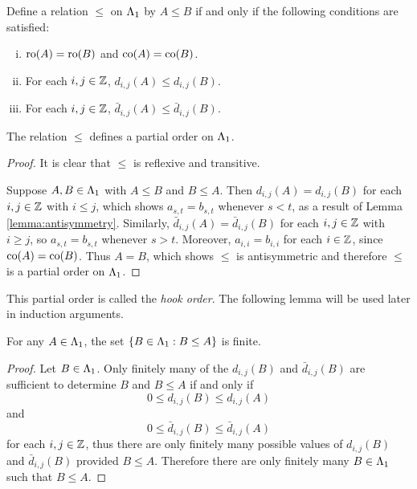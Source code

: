 \documentclass[a4paper, 11pt, twoside]{report}
\begin{document}
Define a relation $\le$ on $\Lambda_1{}$ by $A\le B$ if and only if the following conditions are satisfied:
\begin{enumerate}[i.]
\item
$\operatorname{ro}(A)=\operatorname{ro}(B)$ and $\operatorname{co}(A)=\operatorname{co}(B)$.
\item
For each $i,j\in\mathbb{Z}$, $d_{i,j}{(A)}\le d_{i,j}{(B)}$.
\item
For each $i,j\in\mathbb{Z}$, $\bar{d}_{i,j}{(A)} \le \bar{d}_{i,j}{(B)}$.
\end{enumerate}

\begin{lemma}\label{lemma:orbit-poset}
The relation $\le$ defines a partial order on $\Lambda_1{}$.
\end{lemma}

\begin{proof}
It is clear that $\le$ is reflexive and transitive.

Suppose $A,B\in\Lambda_1{}$ with $A\le B$ and $B\le A$. Then $d_{i,j}{(A)} = d_{i,j}{(B)}$ for each $i,j\in\mathbb{Z}$ with $i\le j$, which shows $a_{s,t}=b_{s,t}$ whenever $s<t$, as a result of Lemma \ref{lemma:antisymmetry}. Similarly, $\bar{d}_{i,j}{(A)} = \bar{d}_{i,j}{(B)}$ for each $i,j\in\mathbb{Z}$ with $i\geq j$, so $a_{s,t}=b_{s,t}$ whenever $s>t$. Moreover, $a_{i,i}=b_{i,i}$ for each $i\in\mathbb{Z}$, since $\operatorname{co}(A)=\operatorname{co}(B)$. Thus $A=B$, which shows $\le$ is antisymmetric and therefore $\le$ is a partial order on $\Lambda_1{}$.
\end{proof}

This partial order is called the \emph{hook order}. The following lemma will be used later in induction arguments.

\begin{lemma}\label{lemma:finite-descent-hook-order}
For any $A\in\Lambda_1{}$, the set $\{B\in\Lambda_1{}:B\le A\}$ is finite.
\end{lemma}

\begin{proof}
Let $B\in\Lambda_1{}$. Only finitely many of the $d_{i,j}{(B)}$ and $\bar{d}_{i,j}{(B)}$ are sufficient to determine $B$ and $B\le A$ if and only if
\begin{equation*}
0\le d_{i,j}{(B)} \le d_{i,j}{(A)}
\end{equation*}
and
\begin{equation*}
0\le \bar{d}_{i,j}{(B)} \le \bar{d}_{i,j}{(A)}
\end{equation*}
for each $i,j\in\mathbb{Z}$, thus there are only finitely many possible values of $d_{i,j}{(B)}$ and $\bar{d}_{i,j}{(B)}$ provided $B\le A$. Therefore there are only finitely many $B\in\Lambda_1{}$ such that $B\le A$.
\end{proof}
\end{document}
